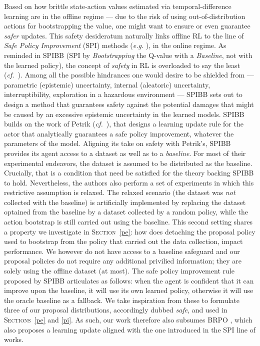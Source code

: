 Based on how brittle state-action values estimated via temporal-difference learning are in the offline regime
--- due to the risk of using out-of-distribution actions
for bootstrapping the value,
one might want to ensure or even guarantee \emph{safer} updates.
This safety desideratum naturally links offline RL
to the line of \textit{Safe Policy Improvement} (SPI)
methods (\textit{e.g.} \cite{Thomas2015-ex, Petrik2016-yc, Laroche2019-ar}), in the online regime.
As reminded in SPIBB \cite{Laroche2019-ar}
(SPI by \textit{Bootstrapping} the Q-value with a \textit{Baseline}, not with the learned policy),
the concept of \emph{safety} in RL is overloaded to say the least
(\textit{cf.}~\cite{Garcia2015-qk}).
Among all the possible hindrances one would desire to be shielded from
--- parametric (epistemic) uncertainty, internal (aleatoric) uncertainty,
interruptibility, exploration in a hazardous environment --- SPIBB sets out to design a method that
guarantees safety against the potential damages that might be caused by an excessive epistemic uncertainty
in the learned models.
SPIBB builds on the work of Petrik (\textit{cf.}~\cite{Petrik2016-yc}),
that designs a learning update rule for the actor that analytically guarantees a
safe policy improvement,
whatever the parameters of the model.
Aligning its take on safety with Petrik's,
SPIBB provides its agent access to a dataset as well as to a \emph{baseline}.
For most of their experimental endeavors, the dataset is assumed to be distributed as the baseline.
Crucially, that is a condition that need be satisfied for the theory backing SPIBB to hold.
Nevertheless, the authors also perform a set of experiments in which this
restrictive assumption is relaxed.
The relaxed scenario (the dataset was \emph{not} collected with the baseline)
is artificially implemented by replacing the dataset optained from the baseline
by a dataset collected by a random policy,
while the action bootstrap is still carried out using the baseline.
This second setting shares a property we investigate in \textsc{Section}~\ref{pe}:
how does detaching
the proposal policy used to bootstrap from
the policy that carried out the data collection,
impact performance.
We however do not have access to a baseline safeguard and our proposal policies
do not require any additional privilied information; they are solely using the offline dataset (at most).
The safe policy improvement rule proposed by SPIBB articulates as follows:
when the agent is confident that it can improve upon the baseline,
it will use its own learned policy, otherwise it will use the oracle baseline as a fallback.
We take inspiration from these to formulate three of our proposal distributions,
accordingly dubbed \emph{safe}, and used in \textsc{Sections}~\ref{pe} and \ref{pi}.
As such, our work therefore also subsumes BRPO \cite{Sohn2020-ay},
which also proposes a learning update aligned with the one introduced in the SPI line of works.

